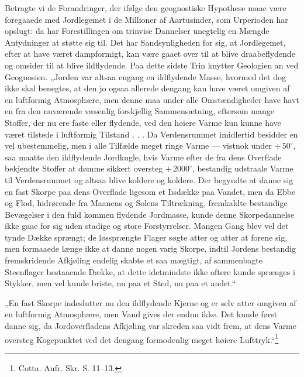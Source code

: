 \documentclass[12pt,a4paper]{book}
\begin{document}
Betragte vi de Forandringer, der ifølge den geognostiske Hypothese maae være
foregaaede med Jordlegemet i de Millioner af Aartusinder, som Urperioden har
opslugt: da har Forestillingen om trinvise Dannelser unegtelig en Mængde
Antydninger at støtte sig til. Det har Sandsynligheden for sig, at
Jordlegemet, efter at have været dampformigt, kan være gaaet over til at blive
draabeflydende og omsider til at blive ildflydende. Paa dette sidste Trin
knytter Geologien an ved Geognosien. „Jorden var altsaa engang en ildflydende
Masse, hvormed det dog ikke skal benegtes, at den jo ogsaa allerede dengang
kan have været omgiven af en luftformig Atmosphære, men denne maa under alle
Omstændigheder have havt en fra den nuværende væsenlig forskjellig
Sammensætning, eftersom mange Stoffer, der nu ere faste eller flydende, ved
den høiere Varme kun kunne have været tilstede i luftformig Tilstand . . . Da
Verdensrummet imidlertid besidder en vel ubestemmelig, men i alle Tilfælde
meget ringe Varme --- vistnok under $\div\,50^{\circ}$, saa maatte den
ildflydende Jordkugle, hvis Varme efter de fra dens Overflade bekjendte
Stoffer at dømme sikkert oversteg $+\,2000^{\circ}$, bestandig udstraale Varme
til Verdensrummet og altsaa blive koldere og koldere. Der begyndte at danne
sig en fast Skorpe paa dens Overflade ligesom et Iisdække paa Vandet, men da
Ebbe og Flod, hidrørende fra Maanens og Solens Tiltrækning, fremkaldte
bestandige Bevægelser i den fuld\-%
kommen flydende Jordmasse, kunde denne Skorpedannelse ikke gaae for sig uden
stadige og store Forstyrrelser. Mangen Gang blev vel det tynde Dække sprængt;
de løssprængte Flager søgte atter og atter at forene sig, men formaaede længe
ikke at danne nogen varig Skorpe, indtil Jordens bestandig fremskridende
Afkjøling endelig skabte et saa mægtigt, af sammenbagte Steenflager bestaaende
Dække, at dette idetmindste ikke oftere kunde sprænges i Stykker, men vel
kunde briste, nu paa et Sted, nu paa et andet.“

„En fast Skorpe indeslutter nu den ildflydende Kjerne og er selv atter omgiven
af en luftformig Atmosphære, men Vand gives der endnu ikke. Det kunde først
danne sig, da Jordoverfladens Afkjøling var skreden saa vidt frem, at dens
Varme oversteg Kogepunktet ved det dengang formodenlig meget høiere
Lufttryk.“\footnote{%
Cotta. Anfr. Skr. S. 11--13.}
\end{document}
